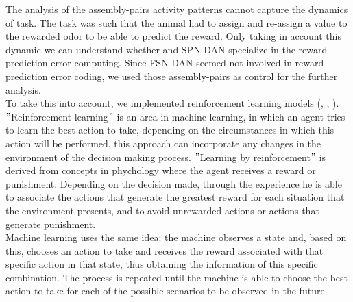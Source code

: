 The analysis of the assembly-pairs activity patterns cannot capture the dynamics of task. The task was such that the animal had to assign and re-assign a value to the rewarded odor to be able to predict the reward. Only taking in account this dynamic we can understand whether and SPN-DAN specialize in the reward prediction error computing. Since FSN-DAN seemed not involved in reward prediction error coding, we used those assembly-pairs as control for the further analysis.\\To take this into account, we implemented reinforcement learning models (\cite{RescorlaWagner}, \cite{Sutton}, \cite{SuttonBarto}).\\$"$Reinforcement learning$"$ is an area in machine learning, in which an agent tries to learn the best action to take, depending on the circumstances in which this action will be performed, this approach can incorporate any changes in the environment of the decision making process. $"$Learning by reinforcement$"$ is derived from concepts in phychology where the agent receives a reward or punishment. Depending on the decision made, through the experience he is able to associate the actions that generate the greatest reward for each situation that the environment presents, and to avoid unrewarded actions or actions that generate punishment.\\Machine learning uses the same idea: the machine observes a state and, based on this, chooses an action to take and receives the reward associated with that specific action in that state, thus obtaining the information of this specific combination. The process is repeated until the machine is able to choose the best action to take for each of the possible scenarios to be observed in the future.\\

